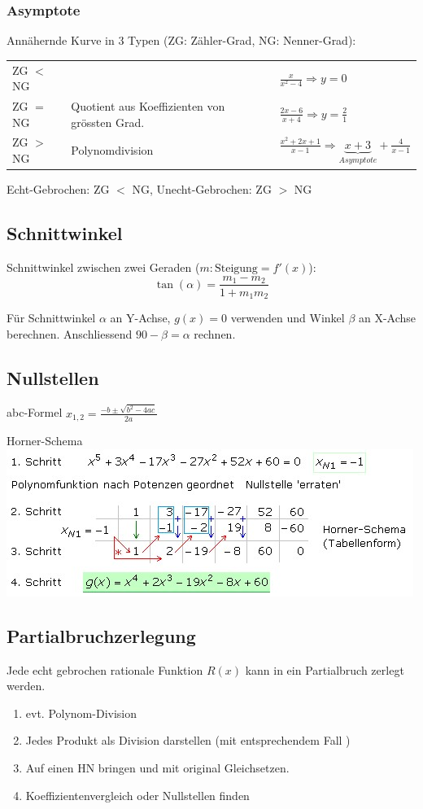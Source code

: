 \subsubsection{Asymptote }
Annähernde Kurve in 3 Typen (ZG: Zähler-Grad, NG: Nenner-Grad):\\
\begin{tabular}{p{1.5cm}p{3.1cm}p{4.2cm}}
	ZG $<$ NG & & $\frac{x}{x^2 - 4} \Rightarrow y = 0$ \\
	ZG $=$ NG & Quotient aus Koeffizienten von grössten Grad. & $\frac{2x-6}{x+4} \Rightarrow y = \frac{2}{1}$ \\
	ZG $>$ NG & Polynomdivision & $\frac{x^2 + 2x + 1}{x - 1} \Rightarrow \underbrace{x + 3}_{Asymptote} + \frac{4}{x -1}$
\end{tabular}

\noindent Echt-Gebrochen: ZG $<$ NG, Unecht-Gebrochen: ZG $>$ NG

\subsection{Schnittwinkel}
Schnittwinkel zwischen zwei Geraden ($m: \text{Steigung} = f'(x)$):
\[ \tan(\alpha) = \frac{m_1 - m_2}{1 + m_1m_2} \]

\noindent Für Schnittwinkel $\alpha$ an Y-Achse, $g(x) = 0$ verwenden und Winkel $\beta$ an X-Achse berechnen. Anschliessend $90-\beta = \alpha$ rechnen.\\


\subsection{Nullstellen}
\noindent abc-Formel $x_{1,2} = \frac{-b\pm\sqrt{b^2-4ac}}{2a}$

\noindent Horner-Schema \\
\includegraphics[width=\columnwidth]{./Images/horner.jpg}


\subsection{Partialbruchzerlegung}
Jede echt gebrochen rationale Funktion $R(x)$ kann in ein Partialbruch zerlegt werden.
\begin{enumerate}[nosep]
	\item evt. Polynom-Division
	\item Jedes Produkt als Division darstellen (mit entsprechendem Fall )
	\item Auf einen HN bringen und mit original Gleichsetzen.
	\item Koeffizientenvergleich oder Nullstellen finden
\end{enumerate}

